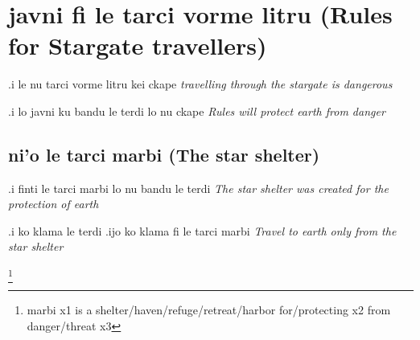 \documentclass{article}
\newcommand{\para}[2]{#1 \emph{#2}}
\newcommand{\usefulWord}[2]{\footnote{#1 #2}}
\begin{document}
\section{javni fi le tarci vorme litru (Rules for Stargate travellers)}

\para{.i le nu tarci vorme litru kei ckape}{travelling through the stargate is dangerous}

\para{.i lo javni ku bandu le terdi lo nu ckape}{Rules will protect earth from danger}

\subsection{ni'o le tarci marbi (The star shelter)}

\para{.i finti le tarci marbi lo nu bandu le terdi}{The star shelter was created for the protection of earth}

\para{.i ko klama le terdi .ijo ko klama fi le tarci marbi}{Travel to earth only from the star shelter}




\usefulWord{marbi}{x1 is a shelter/haven/refuge/retreat/harbor for/protecting x2 from danger/threat x3}
\end{document}
